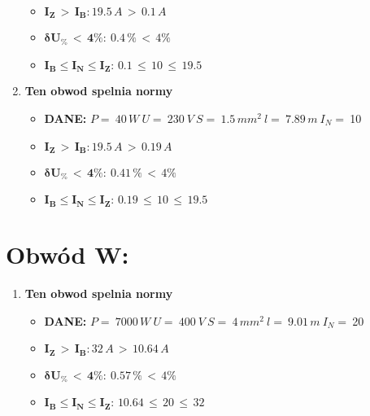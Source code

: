 \begin{enumerate}
\begin{itemize}
\item[\textcolor{Green}{\cmark}] $ \pmb{I_Z \, >  \, I_B: }19.5 \, A \, > \,0.1 \, A $
\item[\textcolor{Green}{\cmark}] $ \pmb{ \delta U_\% \, < \, 4\%:} \:0.4 \, \% \,< \, 4\% $
\item[\textcolor{Green}{\cmark}] $ \pmb{I_B \le I_N \le I_Z: } \, 0.1 \, \le \,10 \, \le \,19.5 $
\end{itemize}
\item \textcolor{Green}{\cmark} \textbf{Ten obwod spelnia normy} 
\begin{itemize}
\item[] \textbf{DANE: } \: $ P = \:40\, W\: U = \:230\: V\: S = \:1.5\, mm^2\: l = \:7.89\, m\: I_N= \: $10
\item[\textcolor{Green}{\cmark}] $ \pmb{I_Z \, >  \, I_B: }19.5 \, A \, > \,0.19 \, A $
\item[\textcolor{Green}{\cmark}] $ \pmb{ \delta U_\% \, < \, 4\%:} \:0.41 \, \% \,< \, 4\% $
\item[\textcolor{Green}{\cmark}] $ \pmb{I_B \le I_N \le I_Z: } \, 0.19 \, \le \,10 \, \le \,19.5 $
\end{itemize}
\end{enumerate}
\section{Obwód W:}

\begin{enumerate}
\item \textcolor{Green}{\cmark} \textbf{Ten obwod spelnia normy} 
\begin{itemize}
\item[] \textbf{DANE: } \: $ P = \:7000\, W\: U = \:400\: V\: S = \:4\, mm^2\: l = \:9.01\, m\: I_N= \: $20
\item[\textcolor{Green}{\cmark}] $ \pmb{I_Z \, >  \, I_B: }32 \, A \, > \,10.64 \, A $
\item[\textcolor{Green}{\cmark}] $ \pmb{ \delta U_\% \, < \, 4\%:} \:0.57 \, \% \,< \, 4\% $
\item[\textcolor{Green}{\cmark}] $ \pmb{I_B \le I_N \le I_Z: } \, 10.64 \, \le \,20 \, \le \,32 $
\end{itemize}
\end{enumerate}